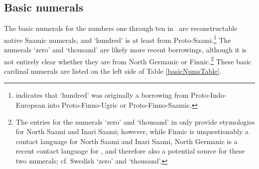 \subsection{Basic numerals}\label{basicNums}
The basic numerals for the numbers one through ten in \PS\ are reconstructable native Saamic numerals, and  ‘hundred’ is at least from Proto-Saami.\footnote{\citet[234-235]{Sammallahti1998} indicates that  ‘hundred’ was originally a borrowing from Proto-Indo-European into Proto-Finno-Ugric or Proto-Finno-Saamic.} 
The numerals  ‘zero’ and  ‘thousand’ are likely more recent borrowings, although it is not entirely clear whether they are from North Germanic or %
Finnic.\footnote{The entries for the numerals ‘zero’ and ‘thousand’ in \cite{alguWebsite} only provide etymologies for North Saami and Inari Saami; however, while Finnic is unquestionably a contact language for North Saami and Inari Saami, North Germanic is a recent contact language for \PS, and therefore also a potential source for these two numerals; cf. Swedish  ‘zero’ and  ‘thousand’. } 
These basic cardinal numerals are listed on the left side of Table \vref{basicNumsTable}.
